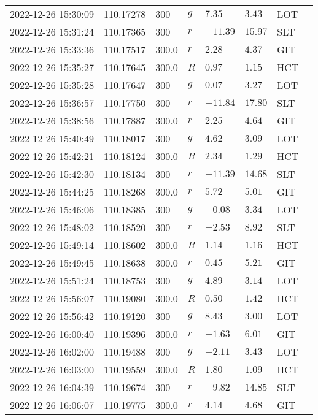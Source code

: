 \documentclass{nature_plusfigure}
\begin{document}
\begin{supplement}
\begin{center}
\begin{longtable}{llllllll}
2022-12-26 15:30:09 & 110.17278 & 300 & $g$ & $7.35$ & $3.43$ & LOT &  \\ 
2022-12-26 15:31:24 & 110.17365 & 300 & $r$ & $-11.39$ & $15.97$ & SLT &  \\ 
2022-12-26 15:33:36 & 110.17517 & 300.0 & $r$ & $2.28$ & $4.37$ & GIT &  \\ 
2022-12-26 15:35:27 & 110.17645 & 300.0 & $R$ & $0.97$ & $1.15$ & HCT &  \\ 
2022-12-26 15:35:28 & 110.17647 & 300 & $g$ & $0.07$ & $3.27$ & LOT &  \\ 
2022-12-26 15:36:57 & 110.17750 & 300 & $r$ & $-11.84$ & $17.80$ & SLT &  \\ 
2022-12-26 15:38:56 & 110.17887 & 300.0 & $r$ & $2.25$ & $4.64$ & GIT &  \\ 
2022-12-26 15:40:49 & 110.18017 & 300 & $g$ & $4.62$ & $3.09$ & LOT &  \\ 
2022-12-26 15:42:21 & 110.18124 & 300.0 & $R$ & $2.34$ & $1.29$ & HCT &  \\ 
2022-12-26 15:42:30 & 110.18134 & 300 & $r$ & $-11.39$ & $14.68$ & SLT &  \\ 
2022-12-26 15:44:25 & 110.18268 & 300.0 & $r$ & $5.72$ & $5.01$ & GIT &  \\ 
2022-12-26 15:46:06 & 110.18385 & 300 & $g$ & $-0.08$ & $3.34$ & LOT &  \\ 
2022-12-26 15:48:02 & 110.18520 & 300 & $r$ & $-2.53$ & $8.92$ & SLT &  \\ 
2022-12-26 15:49:14 & 110.18602 & 300.0 & $R$ & $1.14$ & $1.16$ & HCT &  \\ 
2022-12-26 15:49:45 & 110.18638 & 300.0 & $r$ & $0.45$ & $5.21$ & GIT &  \\ 
2022-12-26 15:51:24 & 110.18753 & 300 & $g$ & $4.89$ & $3.14$ & LOT &  \\ 
2022-12-26 15:56:07 & 110.19080 & 300.0 & $R$ & $0.50$ & $1.42$ & HCT &  \\ 
2022-12-26 15:56:42 & 110.19120 & 300 & $g$ & $8.43$ & $3.00$ & LOT &  \\ 
2022-12-26 16:00:40 & 110.19396 & 300.0 & $r$ & $-1.63$ & $6.01$ & GIT &  \\ 
2022-12-26 16:02:00 & 110.19488 & 300 & $g$ & $-2.11$ & $3.43$ & LOT &  \\ 
2022-12-26 16:03:00 & 110.19559 & 300.0 & $R$ & $1.80$ & $1.09$ & HCT &  \\ 
2022-12-26 16:04:39 & 110.19674 & 300 & $r$ & $-9.82$ & $14.85$ & SLT &  \\ 
2022-12-26 16:06:07 & 110.19775 & 300.0 & $r$ & $4.14$ & $4.68$ & GIT &  \\ 

\end{longtable}
\end{center}
\end{supplement}
\end{document}
